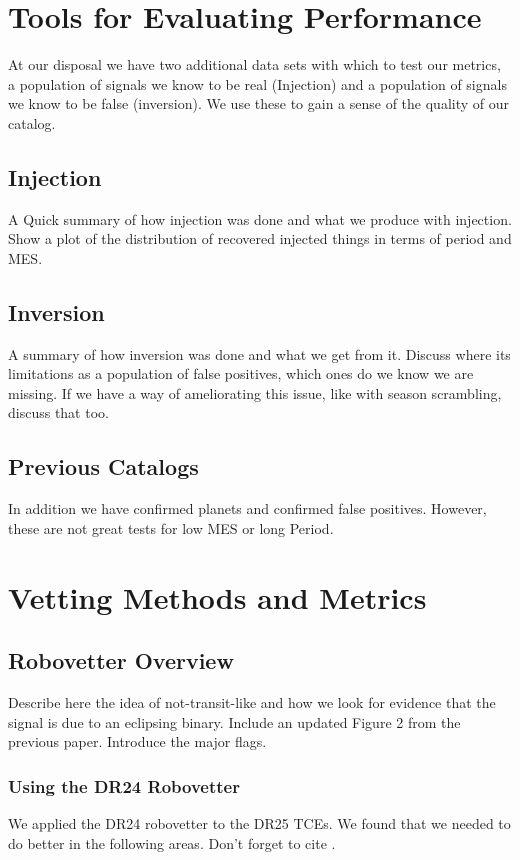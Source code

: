 \documentclass[onecolumn]{aastex6}
\begin{document}
\section{Tools for Evaluating Performance}
 At our disposal we have two additional data sets with which to test our metrics, a population of signals we know to be real (Injection) and a population of signals we know to be false (inversion). We use these to gain a sense of the quality of our catalog.
\subsection{Injection} 
A Quick summary of how injection was done and what we produce with injection. Show a plot of the distribution of recovered injected things in terms of period and MES.
\subsection{Inversion} 
A summary of how inversion was done and what we get from it. Discuss where its limitations as a population of false positives, which ones do we know we are missing. If we have a way of ameliorating this issue, like with season scrambling, discuss that too.

\subsection{Previous Catalogs}In addition we have confirmed planets and confirmed false positives. However, these are not great tests for low MES or long Period.


\section{Vetting Methods and Metrics}

\subsection{Robovetter Overview}
Describe here the idea of not-transit-like and how we look for evidence that the signal is due to an eclipsing binary. Include an updated Figure 2 from the previous paper. Introduce the major flags.
\subsubsection{Using the DR24 Robovetter}
 We applied the DR24 robovetter to the DR25 TCEs. 
 We found that we needed to do better in the following areas.
 Don't forget to cite \citet{Tange2011a}.
 
\end{document}
